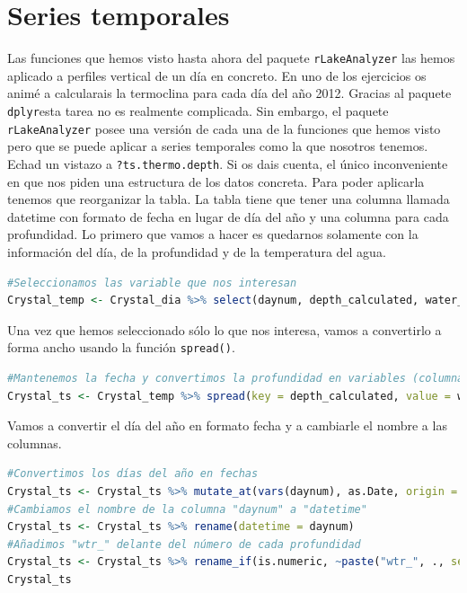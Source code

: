 \documentclass[
]{book}
\newcommand{\passthrough}[1]{#1}
\begin{document}
\hypertarget{series-temporales}{%
\section{Series temporales}\label{series-temporales}}

Las funciones que hemos visto hasta ahora del paquete \passthrough{\lstinline!rLakeAnalyzer!} las hemos aplicado a perfiles vertical de un día en concreto. En uno de los ejercicios os animé a calcularais la termoclina para cada día del año 2012. Gracias al paquete \passthrough{\lstinline!dplyr!}esta tarea no es realmente complicada. Sin embargo, el paquete \passthrough{\lstinline!rLakeAnalyzer!} posee una versión de cada una de la funciones que hemos visto pero que se puede aplicar a series temporales como la que nosotros tenemos. Echad un vistazo a \passthrough{\lstinline!?ts.thermo.depth!}.
Si os dais cuenta, el único inconveniente en que nos piden una estructura de los datos concreta. Para poder aplicarla tenemos que reorganizar la tabla. La tabla tiene que tener una columna llamada datetime con formato de fecha en lugar de día del año y una columna para cada profundidad.
Lo primero que vamos a hacer es quedarnos solamente con la información del día, de la profundidad y de la temperatura del agua.

\begin{lstlisting}[language=R]
#Seleccionamos las variable que nos interesan
Crystal_temp <- Crystal_dia %>% select(daynum, depth_calculated, water_temp)
\end{lstlisting}

Una vez que hemos seleccionado sólo lo que nos interesa, vamos a convertirlo a forma ancho usando la función \passthrough{\lstinline!spread()!}.

\begin{lstlisting}[language=R]
#Mantenemos la fecha y convertimos la profundidad en variables (columnas) incluyendo el valor de temperatura en cada columna.
Crystal_ts <- Crystal_temp %>% spread(key = depth_calculated, value = water_temp)
\end{lstlisting}

Vamos a convertir el día del año en formato fecha y a cambiarle el nombre a las columnas.

\begin{lstlisting}[language=R]
#Convertimos los días del año en fechas
Crystal_ts <- Crystal_ts %>% mutate_at(vars(daynum), as.Date, origin = "2012-01-01")
#Cambiamos el nombre de la columna "daynum" a "datetime"
Crystal_ts <- Crystal_ts %>% rename(datetime = daynum)
#Añadimos "wtr_" delante del número de cada profundidad
Crystal_ts <- Crystal_ts %>% rename_if(is.numeric, ~paste("wtr_", ., sep = ""))
Crystal_ts
\end{lstlisting}
\end{document}
